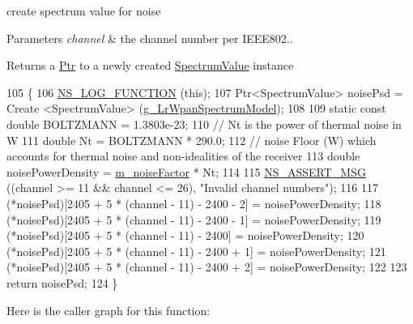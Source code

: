 create spectrum value for noise 


\begin{DoxyParams}{Parameters}
{\em channel} & the channel number per I\+E\+E\+E802.. \\
\hline
\end{DoxyParams}
\begin{DoxyReturn}{Returns}
a \hyperlink{classns3_1_1Ptr}{Ptr} to a newly created \hyperlink{classns3_1_1SpectrumValue}{Spectrum\+Value} instance 
\end{DoxyReturn}

\begin{DoxyCode}
105 \{
106   \hyperlink{log-macros-disabled_8h_a90b90d5bad1f39cb1b64923ea94c0761}{NS\_LOG\_FUNCTION} (\textcolor{keyword}{this});
107   Ptr<SpectrumValue> noisePsd = Create <SpectrumValue> (\hyperlink{namespacens3_a42737ccd2a2a0c75325fbf6abfffda10}{g\_LrWpanSpectrumModel});
108 
109   \textcolor{keyword}{static} \textcolor{keyword}{const} \textcolor{keywordtype}{double} BOLTZMANN = 1.3803e-23;
110   \textcolor{comment}{// Nt  is the power of thermal noise in W}
111   \textcolor{keywordtype}{double} Nt = BOLTZMANN * 290.0;
112   \textcolor{comment}{// noise Floor (W) which accounts for thermal noise and non-idealities of the receiver}
113   \textcolor{keywordtype}{double} noisePowerDensity = \hyperlink{classns3_1_1LrWpanSpectrumValueHelper_aa5ff3ee6c408d74dea64ee98743a5fac}{m\_noiseFactor} * Nt;
114 
115   \hyperlink{assert_8h_aff5ece9066c74e681e74999856f08539}{NS\_ASSERT\_MSG} ((channel >= 11 && channel <= 26), \textcolor{stringliteral}{"Invalid channel numbers"});
116 
117   (*noisePsd)[2405 + 5 * (channel - 11) - 2400 - 2] = noisePowerDensity;
118   (*noisePsd)[2405 + 5 * (channel - 11) - 2400 - 1] = noisePowerDensity;
119   (*noisePsd)[2405 + 5 * (channel - 11) - 2400] = noisePowerDensity;
120   (*noisePsd)[2405 + 5 * (channel - 11) - 2400 + 1] = noisePowerDensity;
121   (*noisePsd)[2405 + 5 * (channel - 11) - 2400 + 2] = noisePowerDensity;
122 
123   \textcolor{keywordflow}{return} noisePsd;
124 \}
\end{DoxyCode}


Here is the caller graph for this function\+:


